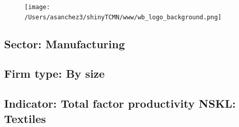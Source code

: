 \documentclass{article}\usepackage[]{graphicx}\usepackage[]{color}
\begin{document}
%

\begin{figure}
  \vspace{-3ex} %
  \hspace{-7ex} %
  \texttt{[image: /Users/asanchez3/shinyTCMN/www/wb\_logo\_background.png]}
\end{figure}
 \begin{minipage}[t]{1.1\textwidth} %
      \vspace{-30ex}
      \hspace{10ex}
  \end{minipage}
  
%
\begin{minipage}[t]{0.99\textwidth} %
  \vspace{-0.5cm}
      \subsection*{\color{white!40!black}Sector: \color{blue!40!black}Manufacturing}
      \subsection*{\color{white!40!black}Firm type: \color{blue!40!black}By size}
      \subsection*{\color{white!40!black}Indicator: \color{blue!40!black}Total factor productivity NSKL: Textiles}
  \end{minipage} %
\end{document}
